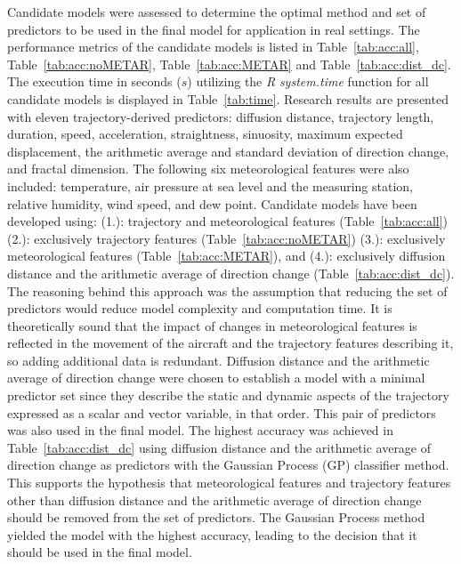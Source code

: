 \let\LaTeXcline\cline\documentclass[sn-mathphys-num]{sn-jnl}\let\cline\LaTeXcline
\begin{document}
Candidate models were assessed to determine the optimal method and set of predictors to be used in the final model for application in real settings. The performance metrics of the candidate models is listed in Table~\ref{tab:acc:all}, Table~\ref{tab:acc:noMETAR}, Table~\ref{tab:acc:METAR} and Table~\ref{tab:acc:dist_dc}. The execution time in seconds ($s$) utilizing the \textit{R} \textit{system.time} function for all candidate models is displayed in Table~\ref{tab:time}. Research results are presented with eleven trajectory-derived predictors: diffusion distance, trajectory length, duration, speed, acceleration, straightness, sinuosity, maximum expected displacement, the arithmetic average and standard deviation of direction change, and fractal dimension. The following six meteorological features were also included: temperature, air pressure at sea level and the measuring station, relative humidity, wind speed, and dew point. Candidate models have been developed using: (1.): trajectory and meteorological features (Table~\ref{tab:acc:all}) (2.): exclusively trajectory features (Table~\ref{tab:acc:noMETAR}) (3.): exclusively meteorological features (Table~\ref{tab:acc:METAR}), and (4.): exclusively diffusion distance and the arithmetic average of direction change (Table~\ref{tab:acc:dist_dc}). The reasoning behind this approach was the assumption that reducing the set of predictors would reduce model complexity and computation time. It is theoretically sound that the impact of changes in meteorological features is reflected in the movement of the aircraft and the trajectory features describing it, so adding additional data is redundant. Diffusion distance and the arithmetic average of direction change were chosen to establish a model with a minimal predictor set since they describe the static and dynamic aspects of the trajectory expressed as a scalar and vector variable, in that order. This pair of predictors was also used in the final model. The highest accuracy was achieved in Table~\ref{tab:acc:dist_dc} using diffusion distance and the arithmetic average of direction change as predictors with the Gaussian Process (GP) classifier method. This supports the hypothesis that meteorological features and trajectory features other than diffusion distance and the arithmetic average of direction change should be removed from the set of predictors. The Gaussian Process method yielded the model with the highest accuracy, leading to the decision that it should be used in the final model.
\end{document}
